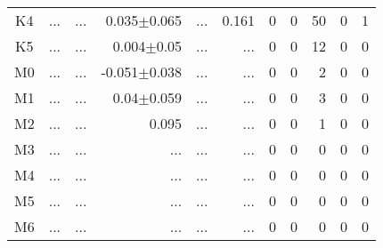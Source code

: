 \begin{table}[t]
\begin{table}[t]
\begin{center}
\begin{tabular}{c|rrrrr|rrrrr}
    K4	&	 ...	&	 ...	&	0.035$\pm$0.065	&	 ...	&	0.161	&	0	&	0	&	50	&	0	&	1	\\
    K5	&	 ...	&	 ...	&	0.004$\pm$0.05	&	 ...	&	 ...	&	0	&	0	&	12	&	0	&	0	\\
    M0	&	 ...	&	 ...	&	-0.051$\pm$0.038	&	 ...	&	 ...	&	0	&	0	&	2	&	0	&	0	\\
    M1	&	 ...	&	 ...	&	0.04$\pm$0.059	&	 ...	&	 ...	&	0	&	0	&	3	&	0	&	0	\\
    M2	&	 ...	&	 ...	&	0.095	&	 ...	&	 ...	&	0	&	0	&	1	&	0	&	0	\\
    M3	&	 ...	&	 ...	&	 ...	&	 ...	&	 ...	&	0	&	0	&	0	&	0	&	0	\\
    M4	&	 ...	&	 ...	&	 ...	&	 ...	&	 ...	&	0	&	0	&	0	&	0	&	0	\\
    M5	&	 ...	&	 ...	&	 ...	&	 ...	&	 ...	&	0	&	0	&	0	&	0	&	0	\\
    M6	&	 ...	&	 ...	&	 ...	&	 ...	&	 ...	&	0	&	0	&	0	&	0	&	0	\\
        \bottomrule
        \end{tabular}
    \end{center}
    \end{table}
\end{table}